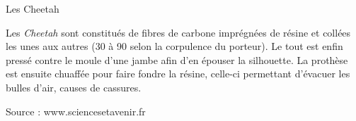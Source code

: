 \begin{doc}
	\label{doc:cheetah}
	\caption{Les Cheetah}
	
	Les \emph{Cheetah} sont constitués de fibres de carbone imprégnées de résine et collées les unes aux autres (30 à 90 selon la corpulence du porteur). Le tout est enfin pressé contre le moule d'une jambe afin d'en épouser la silhouette. La prothèse est ensuite chuaffée pour faire fondre la résine, celle-ci permettant d'évacuer les bulles d'air, causes de cassures.
	
	{\small Source : www.sciencesetavenir.fr}
	
\end{doc}